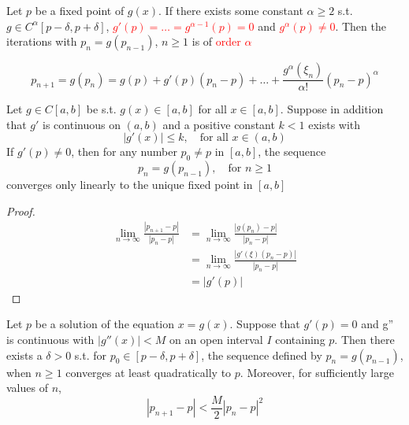 \documentclass[11pt]{article}
\begin{document}
\begin{theorem}
  Let $p$ be a fixed point of $g(x)$. If there exists some constant $\alpha\ge
  2$ s.t. $g\in C^\alpha[p-\delta,p+\delta]$,
  \textcolor{red}{$g'(p)=\dots=g^{\alpha-1}(p)=0$} and \textcolor{red}{$g^\alpha(p)\neq 0$}.
  Then the iterations with $p_n=g(p_{n-1})$, $n\ge1$ is of \textcolor{red}{order $\alpha$}
\end{theorem}

\begin{equation*}
  p_{n+1}=g(p_n)=g(p)+g'(p)(p_n-p)+\dots+\frac{g^\alpha(\xi_n)}{\alpha!}(p_n-p)^\alpha
\end{equation*}

\begin{theorem}
  Let $g\in C[a,b]$ be s.t. $g(x)\in[a,b]$ for all $x\in[a,b]$. Suppose in
  addition that $g'$ is continuous on $(a,b)$ and a positive constant $k<1$
  exists with
  \begin{equation*}
    |g'(x)|\le k, \quad \text{for all } x\in(a,b)
  \end{equation*}
  If $g'(p)\neq0$, then for any number $p_0\neq p$ in $[a,b]$, the sequence
  \begin{equation*}
    p_n=g(p_{n-1}),\quad\text{for }n\ge 1
  \end{equation*}
  converges only linearly to the unique fixed point in $[a,b]$
\end{theorem}

\begin{proof}
  \begin{align*}
    \lim\limits_{n\to\infty}\frac{|p_{n+1}-p|}{|p_n-p|}&=
                                                         \lim\limits_{n\to\infty}\frac{|g(p_n)-p|}{|p_n-p|}\\
                                                       &=\lim\limits_{n\to\infty}\frac{|g'(\xi)(p_n-p)|}{|p_n-p|}\\
                                                       &=|g'(p)|
  \end{align*}
\end{proof}

\begin{theorem}
  Let $p$ be a solution of the equation $x=g(x)$. Suppose that $g'(p)=0$ and
  g'' is continuous with $|g''(x)|<M$ on an open interval $I$ containing $p$.
  Then there exists a $\delta>0$ s.t. for $p_0\in[p-\delta,p+\delta]$, the
  sequence defined by $p_n=g(p_{n-1})$, when $n\ge 1$ converges at least
  quadratically to $p$. Moreover, for sufficiently large values of $n$,
  \begin{equation*}
    |p_{n+1}-p|<\frac{M}{2}|p_n-p|^2
  \end{equation*}
\end{theorem}
\end{document}
